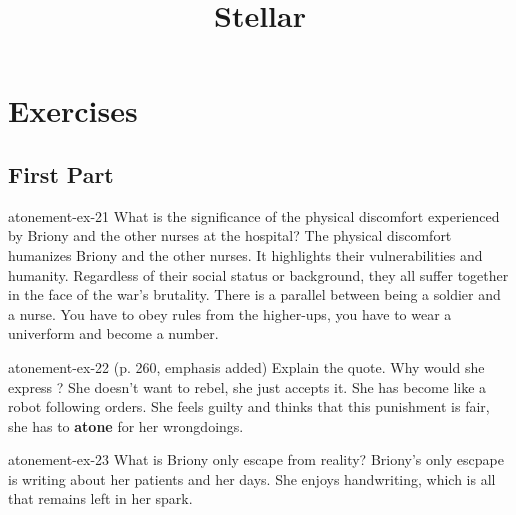 \documentclass[preview]{standalone}
\begin{document}
\title{Stellar}
\genpage

\section{Exercises}

\subsection{First Part}

\begin{snippetexercise}{atonement-ex-21}
    {What is the significance of the physical discomfort experienced by Briony and the other nurses at
    the hospital?}
    The physical discomfort humanizes Briony and the other nurses.
    It highlights their vulnerabilities and humanity. Regardless of their social
    status or background, they all suffer together in the face of the war's brutality.
    There is a parallel between being a soldier and a nurse. You have to obey
    rules from the higher-ups, you have to wear a univerform and become a number.
\end{snippetexercise}

\begin{snippetexercise}{atonement-ex-22}
    { (p. 260, emphasis added) Explain the quote. Why would she express ?}
    She doesn't want to rebel, she just accepts it. She has become like a robot
    following orders.
    She feels guilty and thinks that this punishment is fair,
    she has to \textbf{atone} for her wrongdoings.
\end{snippetexercise}

\begin{snippetexercise}{atonement-ex-23}
    {What is Briony only escape from reality?}
    Briony's only escpape is writing about her patients and her days.
    She enjoys handwriting, which is all that remains left in her spark.
\end{snippetexercise}
\end{document}

